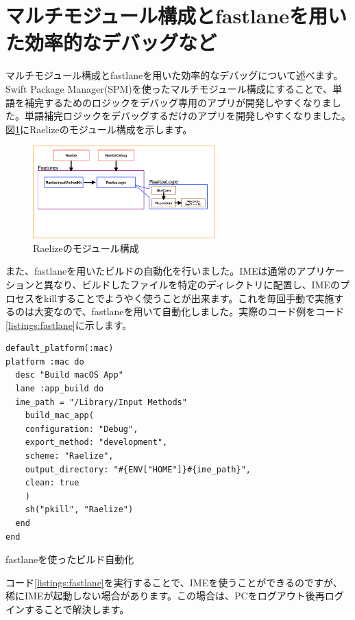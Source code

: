 \documentclass[uplatex,a4j,12pt,twocolumn]{jsarticle}
\begin{document}
\section{マルチモジュール構成とfastlaneを用いた効率的なデバッグなど}\label{sec:multi_module_and_fastlane}
マルチモジュール構成とfastlaneを用いた効率的なデバッグについて述べます。Swift Package Manager(SPM)を使ったマルチモジュール構成にすることで、単語を補完するためのロジックをデバッグ専用のアプリが開発しやすくなりました。単語補完ロジックをデバッグするだけのアプリを開発しやすくなりました。図\ref{fig:raelize_architecture}にRaelizeのモジュール構成を示します。

\begin{figure}[h]
  \begin{center}
      \includegraphics[width=7cm]{image/architecture.png}
      \caption{Raelizeのモジュール構成}
      \label{fig:raelize_architecture}
  \end{center}
\end{figure}

また、fastlaneを用いたビルドの自動化を行いました。IMEは通常のアプリケーションと異なり、ビルドしたファイルを特定のディレクトリに配置し、IMEのプロセスをkillすることでようやく使うことが出来ます\cite{bib:input_method_kit_tips}。これを毎回手動で実施するのは大変なので、fastlaneを用いて自動化しました。実際のコード例をコード\ref{listings:fastlane}に示します。

\begin{listing}[h]
  \begin{verbatim}
default_platform(:mac)
platform :mac do
  desc "Build macOS App"
  lane :app_build do
  ime_path = "/Library/Input Methods"
    build_mac_app(
    configuration: "Debug",
    export_method: "development",
    scheme: "Raelize",
    output_directory: "#{ENV["HOME"]}#{ime_path}",
    clean: true
    )
    sh("pkill", "Raelize")
  end
end
  \end{verbatim}
  \caption{fastlaneを使ったビルド自動化}\label{listings:fastlane}
\end{listing}

コード\ref{listings:fastlane}を実行することで、IMEを使うことができるのですが、稀にIMEが起動しない場合があります。この場合は、PCをログアウト後再ログインすることで解決します。
\end{document}
